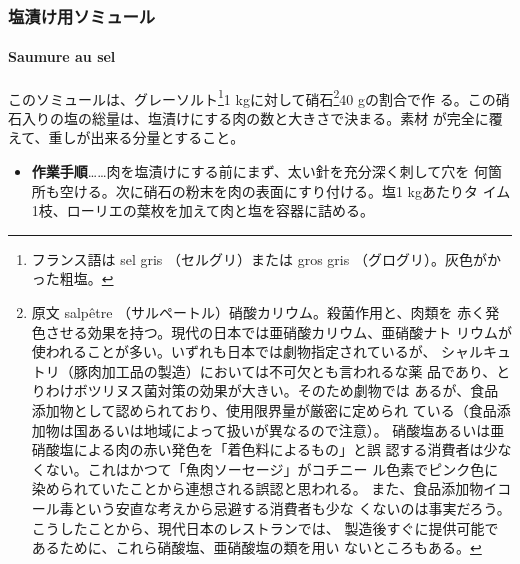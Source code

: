 \begin{recette}
\hypertarget{ux5869ux6f2cux3051ux7528ux30bdux30dfux30e5ux30fcux30eb}{%
\subsubsection{塩漬け用ソミュール}\label{ux5869ux6f2cux3051ux7528ux30bdux30dfux30e5ux30fcux30eb}}

\hypertarget{saumure-au-sel}{%
\paragraph{Saumure au sel}\label{saumure-au-sel}}


このソミュールは、グレーソルト\footnote{フランス語は sel gris
  （セルグリ）または gros gris （グログリ）。灰色がかった粗塩。}1
kgに対して硝石\footnote{原文 salpêtre
  （サルペートル）硝酸カリウム。殺菌作用と、肉類を
  赤く発色させる効果を持つ。現代の日本では亜硝酸カリウム、亜硝酸ナト
  リウムが使われることが多い。いずれも日本では劇物指定されているが、
  シャルキュトリ（豚肉加工品の製造）においては不可欠とも言われるな薬
  品であり、とりわけボツリヌス菌対策の効果が大きい。そのため劇物では
  あるが、食品添加物として認められており、使用限界量が厳密に定められ
  ている（食品添加物は国あるいは地域によって扱いが異なるので注意）。
  硝酸塩あるいは亜硝酸塩による肉の赤い発色を「着色料によるもの」と誤
  認する消費者は少なくない。これはかつて「魚肉ソーセージ」がコチニー
  ル色素でピンク色に染められていたことから連想される誤認と思われる。
  また、食品添加物イコール毒という安直な考えから忌避する消費者も少な
  くないのは事実だろう。こうしたことから、現代日本のレストランでは、
  製造後すぐに提供可能であるために、これら硝酸塩、亜硝酸塩の類を用い
  ないところもある。}40 gの割合で作
る。この硝石入りの塩の総量は、塩漬けにする肉の数と大きさで決まる。素材
が完全に覆えて、重しが出来る分量とすること。

\begin{itemize}
\tightlist
\item
  \textbf{作業手順}\ldots{}\ldots{}肉を塩漬けにする前にまず、太い針を充分深く刺して穴を
  何箇所も空ける。次に硝石の粉末を肉の表面にすり付ける。塩1 kgあたりタ
  イム1枝、ローリエの葉\undemi{}枚を加えて肉と塩を容器に詰める。
\end{itemize}

\maeaki

\hypertarget{ux820cux8089ux7528ux306eux6db2ux4f53ux30bdux30dfux30e5ux30fcux30eb15}{%
}
\end{recette}
